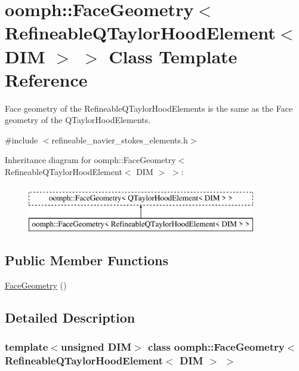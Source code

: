 \hypertarget{classoomph_1_1FaceGeometry_3_01RefineableQTaylorHoodElement_3_01DIM_01_4_01_4}{}\section{oomph\+:\+:Face\+Geometry$<$ Refineable\+Q\+Taylor\+Hood\+Element$<$ D\+IM $>$ $>$ Class Template Reference}
\label{classoomph_1_1FaceGeometry_3_01RefineableQTaylorHoodElement_3_01DIM_01_4_01_4}


Face geometry of the Refineable\+Q\+Taylor\+Hood\+Elements is the same as the Face geometry of the Q\+Taylor\+Hood\+Elements.  




{\ttfamily \#include $<$refineable\+\_\+navier\+\_\+stokes\+\_\+elements.\+h$>$}

Inheritance diagram for oomph\+:\+:Face\+Geometry$<$ Refineable\+Q\+Taylor\+Hood\+Element$<$ D\+IM $>$ $>$\+:\begin{figure}[H]
\begin{center}
\leavevmode
\includegraphics[height=2.000000cm]{classoomph_1_1FaceGeometry_3_01RefineableQTaylorHoodElement_3_01DIM_01_4_01_4}
\end{center}
\end{figure}
\subsection*{Public Member Functions}
\begin{DoxyCompactItemize}
\item 
\hyperlink{classoomph_1_1FaceGeometry_3_01RefineableQTaylorHoodElement_3_01DIM_01_4_01_4_ac3a7961b91cbb5729c307ba11151b559}{Face\+Geometry} ()
\end{DoxyCompactItemize}


\subsection{Detailed Description}
\subsubsection*{template$<$unsigned D\+IM$>$\newline
class oomph\+::\+Face\+Geometry$<$ Refineable\+Q\+Taylor\+Hood\+Element$<$ D\+I\+M $>$ $>$}

